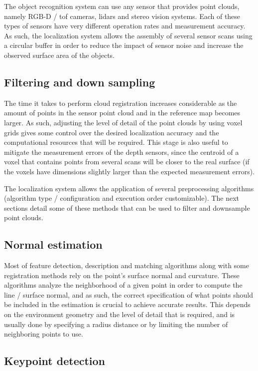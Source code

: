 The object recognition system can use any sensor that provides point clouds, namely RGB-D / \gls{tof} cameras, \glspl{lidar} and stereo vision systems. Each of these types of sensors have very different operation rates and measurement accuracy. As such, the localization system allows the assembly of several sensor scans using a circular buffer in order to reduce the impact of sensor noise and increase the observed surface area of the objects.


\subsection{Filtering and down sampling}

The time it takes to perform cloud registration increases considerable as the amount of points in the sensor point cloud and in the reference map becomes larger. As such, adjusting the level of detail of the point clouds by using voxel grids gives some control over the desired localization accuracy and the computational resources that will be required. This stage is also useful to mitigate the measurement errors of the depth sensors, since the centroid of a voxel that contains points from several scans will be closer to the real surface (if the voxels have dimensions slightly larger than the expected measurement errors).

The localization system allows the application of several preprocessing algorithms (algorithm type / configuration and execution order customizable). The next sections detail some of these methods that can be used to filter and downsample point clouds.


\subsection{Normal estimation}

Most of feature detection, description and matching algorithms along with some registration methods rely on the point's surface normal and curvature. These algorithms analyze the neighborhood of a given point in order to compute the line / surface normal, and as such, the correct specification of what points should be included in the estimation is crucial to achieve accurate results. This depends on the environment geometry and the level of detail that is required, and is usually done by specifying a radius distance or by limiting the number of neighboring points to use.


\subsection{Keypoint detection}

